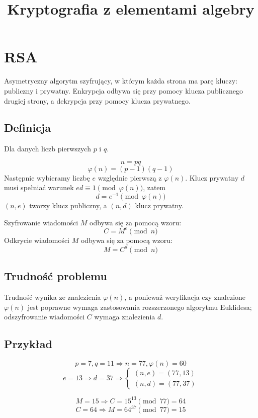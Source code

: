 \documentclass{../notatki}
\title{Kryptografia z elementami algebry}
\begin{document}
\tableofcontents

\section{RSA}

Asymetryczny algorytm szyfrujący, w którym każda strona ma parę
kluczy: publiczny i prywatny. Enkrypcja odbywa się przy pomocy klucza
publicznego drugiej strony, a dekrypcja przy pomocy klucza prywatnego.

\subsection{Definicja}

Dla danych liczb pierwszych $p$ i $q$.

$$
n = pq
$$
$$
\varphi(n) = (p-1)(q-1)
$$
Następnie wybieramy liczbę $e$ względnie pierwszą z $\varphi(n)$.
Klucz prywatny $d$ musi spełniać warunek $ed \equiv 1 \pmod{\varphi(n)}$, zatem
$$
d = e^{-1} \pmod{\varphi(n)}
$$
$(n, e)$ tworzy klucz publiczny, a $(n, d)$ klucz prywatny.

Szyfrowanie wiadomości $M$ odbywa się za pomocą wzoru:
$$
C = M^e \pmod{n}
$$
Odkrycie wiadomości $M$ odbywa się za pomocą wzoru:
$$
M = C^d \pmod{n}
$$

\subsection{Trudność problemu}

Trudność wynika ze znalezienia $\varphi(n)$, a ponieważ weryfikacja
czy znalezione $\varphi(n)$ jest poprawne wymaga zastosowania rozszerzonego
algorytmu Euklidesa; odszyfrowanie wiadomości $C$ wymaga znalezienia $d$.

\subsection{Przykład}

$$
p = 7, q = 11 \Rightarrow n = 77, \varphi(n) = 60
$$
$$
e = 13 \Rightarrow d = 37 \Rightarrow
\begin{cases}
  (n, e) = (77, 13) \\
  (n, d) = (77, 37)
\end{cases}
$$

$$
M = 15 \Rightarrow C = 15^{13} \pmod{77} = 64
$$
$$
C = 64 \Rightarrow M = 64^{37} \pmod{77} = 15
$$
\end{document}
